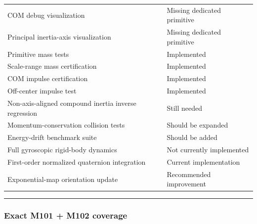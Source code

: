 {\begin{longtable}[]{@{}
  >{\raggedright\arraybackslash}p{}
  >{\raggedright\arraybackslash}p{}@{}}
COM debug visualization & Missing dedicated primitive \\
Principal inertia-axis visualization & Missing dedicated primitive \\
Primitive mass tests & Implemented \\
Scale-range mass certification & Implemented \\
COM impulse certification & Implemented \\
Off-center impulse test & Implemented \\
Non-axis-aligned compound inertia inverse regression & Still needed \\
Momentum-conservation collision tests & Should be expanded \\
Energy-drift benchmark suite & Should be added \\
Full gyroscopic rigid-body dynamics & Not currently implemented \\
First-order normalized quaternion integration & Current implementation \\
Exponential-map orientation update & Recommended improvement \\
\end{longtable}
}

\begin{center}\rule{0.5\linewidth}{0.5pt}\end{center}

\subsubsection{Exact M101 + M102 coverage}\label{exact-m101-m102-coverage}

